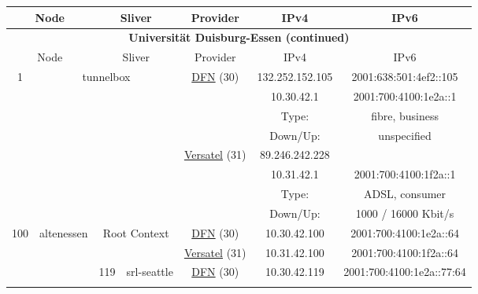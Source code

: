 \begin{small}
\begin{center}
\begin{longtable}{|c|c|c|c|c|c|c|c|}
 \multicolumn{2}{|p{8em}|}{Node} & \multicolumn{2}{|p{8em}|}{Sliver} & \multicolumn{2}{|p{8em}|}{Provider} & IPv4 & IPv6 \\ \hline
\endfirsthead
\hline
 \multicolumn{8}{|c|}{\textbf{Universität Duisburg-Essen (continued)}} \\ \hline
 \multicolumn{2}{|p{8em}|}{Node} & \multicolumn{2}{|p{8em}|}{Sliver} & \multicolumn{2}{|p{8em}|}{Provider} & IPv4 & IPv6 \\ \hline
\endhead
 \multirow{8}{*}{\tiny{1}} & \multicolumn{3}{|c|}{\multirow{8}{*}{\tiny{tunnelbox}}} & \multicolumn{2}{|c|}{\multirow{4}{*}{\tiny{\href{https://www.dfn.de}{DFN} (30)}}} & \tiny{132.252.152.105} & \tiny{2001:638:501:4ef2::105} \\* \cline{7-7}\cline{8-8}
  & \multicolumn{3}{|c|}{} & \multicolumn{2}{|c|}{} & \tiny{10.30.42.1} & \tiny{2001:700:4100:1e2a::1} \\* \cline{7-7}\cline{8-8}
  & \multicolumn{3}{|c|}{} & \multicolumn{2}{|c|}{} & Type: & fibre, business \\* \cline{7-7}\cline{8-8}
  & \multicolumn{3}{|c|}{} & \multicolumn{2}{|c|}{} & Down/Up:  & unspecified \\* \cline{5-5}\cline{6-6}\cline{7-7}\cline{8-8}
  & \multicolumn{3}{|c|}{} & \multicolumn{2}{|c|}{\multirow{4}{*}{\tiny{\href{http://www.versatel.de}{Versatel} (31)}}} & \tiny{89.246.242.228} & \frownie{} \\* \cline{7-7}\cline{8-8}
  & \multicolumn{3}{|c|}{} & \multicolumn{2}{|c|}{} & \tiny{10.31.42.1} & \tiny{2001:700:4100:1f2a::1} \\* \cline{7-7}\cline{8-8}
  & \multicolumn{3}{|c|}{} & \multicolumn{2}{|c|}{} & Type: & ADSL, consumer \\* \cline{7-7}\cline{8-8}
  & \multicolumn{3}{|c|}{} & \multicolumn{2}{|c|}{} & Down/Up:  & 1000 / 16000 Kbit/s \\ \hline
 \multirow{46}{*}{\tiny{100}} & \multicolumn{1}{|l|}{\multirow{46}{*}{\tiny{altenessen}}} & \multicolumn{2}{|c|}{\multirow{2}{*}{\tiny{Root Context}}} & \multicolumn{2}{|c|}{\tiny{\href{https://www.dfn.de}{DFN} (30)}} & \tiny{10.30.42.100} & \tiny{2001:700:4100:1e2a::64} \\* \cline{5-5}\cline{6-6}\cline{7-7}\cline{8-8}
  &  & \multicolumn{2}{|c|}{} & \multicolumn{2}{|c|}{\tiny{\href{http://www.versatel.de}{Versatel} (31)}} & \tiny{10.31.42.100} & \tiny{2001:700:4100:1f2a::64} \\* \cline{3-3}\cline{4-4}\cline{5-5}\cline{6-6}\cline{7-7}\cline{8-8}
  &  & \multirow{2}{*}{\tiny{119}} & \multicolumn{1}{|l|}{\multirow{2}{*}{\tiny{srl-seattle}}} & \multicolumn{2}{|c|}{\tiny{\href{https://www.dfn.de}{DFN} (30)}} & \tiny{10.30.42.119} & \tiny{2001:700:4100:1e2a::77:64} \\* \cline{5-5}\cline{6-6}\cline{7-7}\cline{8-8}

\end{longtable}
\end{center}
\end{small}
